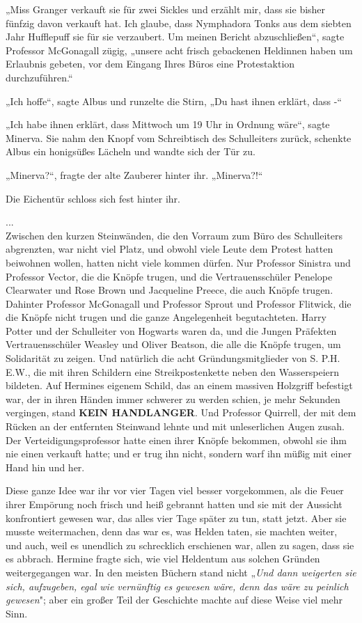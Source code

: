 {„Miss Granger verkauft sie für zwei Sickles und erzählt mir, dass sie bisher fünfzig davon verkauft hat. Ich glaube, dass Nymphadora Tonks aus dem siebten Jahr Hufflepuff sie für sie verzaubert. Um meinen Bericht abzuschließen“, sagte Professor McGonagall zügig, „unsere acht frisch gebackenen Heldinnen haben um Erlaubnis gebeten, vor dem Eingang Ihres Büros eine Protestaktion durchzuführen.“

„Ich hoffe“, sagte Albus und runzelte die Stirn, „Du hast ihnen erklärt, dass -“

„Ich habe ihnen erklärt, dass Mittwoch um 19 Uhr in Ordnung wäre“, sagte Minerva. Sie nahm den Knopf vom Schreibtisch des Schulleiters zurück, schenkte Albus ein honigsüßes Lächeln und wandte sich der Tür zu.

„Minerva?“, fragte der alte Zauberer hinter ihr. „Minerva?!“

Die Eichentür schloss sich fest hinter ihr.

...\\ Zwischen den kurzen Steinwänden, die den Vorraum zum Büro des Schulleiters abgrenzten, war nicht viel Platz, und obwohl viele Leute dem Protest hatten beiwohnen wollen, hatten nicht viele kommen dürfen. Nur Professor Sinistra und Professor Vector, die die Knöpfe trugen, und die Vertrauensschüler Penelope Clearwater und Rose Brown und Jacqueline Preece, die auch Knöpfe trugen. Dahinter Professor McGonagall und Professor Sprout und Professor Flitwick, die die Knöpfe nicht trugen und die ganze Angelegenheit begutachteten. Harry Potter und der Schulleiter von Hogwarts waren da, und die Jungen Präfekten Vertrauensschüler Weasley und Oliver Beatson, die alle die Knöpfe trugen, um Solidarität zu zeigen. Und natürlich die acht Gründungsmitglieder von S. P.H. E.W., die mit ihren Schildern eine Streikpostenkette neben den Wasserspeiern bildeten. Auf Hermines eigenem Schild, das an einem massiven Holzgriff befestigt war, der in ihren Händen immer schwerer zu werden schien, je mehr Sekunden vergingen, stand \textbf{KEIN HANDLANGER}. Und Professor Quirrell, der mit dem Rücken an der entfernten Steinwand lehnte und mit unleserlichen Augen zusah. Der Verteidigungsprofessor hatte einen ihrer Knöpfe bekommen, obwohl sie ihm nie einen verkauft hatte; und er trug ihn nicht, sondern warf ihn müßig mit einer Hand hin und her.

Diese ganze Idee war ihr vor vier Tagen viel besser vorgekommen, als die Feuer ihrer Empörung noch frisch und heiß gebrannt hatten und sie mit der Aussicht konfrontiert gewesen war, das alles vier Tage später zu tun, statt jetzt. Aber sie musste weitermachen, denn das war es, was Helden taten, sie machten weiter, und auch, weil es unendlich zu schrecklich erschienen war, allen zu sagen, dass sie es abbrach. Hermine fragte sich, wie viel Heldentum aus solchen Gründen weitergegangen war. In den meisten Büchern stand nicht „\emph{Und dann weigerten sie sich, aufzugeben, egal wie vernünftig es gewesen wäre, denn das wäre zu peinlich gewesen}"; aber ein großer Teil der Geschichte machte auf diese Weise viel mehr Sinn.

}
